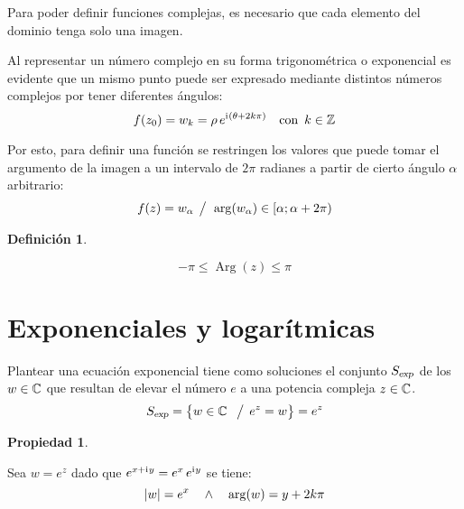 \documentclass[a5paper,12pt,twoside]{book}
\newtheorem{defn}{{Definición}}[chapter]
\newtheorem{prop}{{Propiedad}}[chapter]
\begin{document}
Para poder definir funciones complejas, es necesario que cada elemento del dominio tenga solo una imagen.

Al representar un número complejo en su forma trigonométrica o exponencial es evidente que un mismo punto puede ser expresado mediante distintos números complejos por tener diferentes ángulos:
\begin{equation*}
    f(z_0) = w_k = \rho \, e^{\mathrm{i}\mkern1mu \left( \theta + 2 k \pi \right)} \quad \textrm{con} \enspace k \in \mathbb{Z}
\end{equation*}

Por esto, para definir una función se restringen los valores que puede tomar el argumento de la imagen a un intervalo de $2\pi$ radianes a partir de cierto ángulo $\alpha$ arbitrario:
\begin{equation*}
    f(z) = w_\alpha \hspace{1ex} \big/ \hspace{1ex} \arg(w_\alpha) \in [\alpha;\alpha+2\pi)
\end{equation*}

\begin{mdframed}[style=MyFrame1]
    \begin{defn}
    \end{defn}
    \begin{equation*}
        -\pi \leq \operatorname{Arg}(z) \leq \pi
    \end{equation*}
\end{mdframed}


\section{Exponenciales y logarítmicas}

Plantear una ecuación exponencial tiene como soluciones el conjunto ${{S}_\textsl{{exp}}}$ de los $w \in \mathbb{C}$ que resultan de elevar el número $e$ a una potencia compleja $z \in \mathbb{C}$.
\begin{equation*}
    {{S}_\textsl{{exp}}} = { \left\{ {w \in \mathbb{C}\ \hspace{1ex} \big/ \hspace{1ex} e^z = w} \right\} } = e^z
\end{equation*}

\begin{mdframed}[style=MyFrame1]
    \begin{prop}
    \end{prop}
    Sea $w = e^z$ dado que $e^{x + \mathrm{i}\mkern1mu y} = e^x \, e^{\mathrm{i}\mkern1mu y}$ se tiene:
    \begin{equation*}
        {\left| {w} \right|} = e^x \quad \land \quad \arg(w) = y + 2 k \pi
    \end{equation*}
\end{mdframed}
\end{document}
